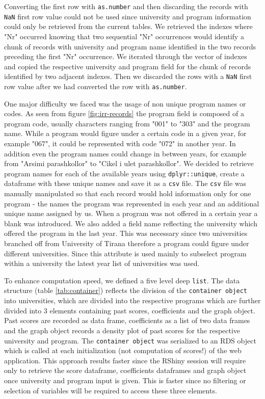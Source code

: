 \documentclass{article}
\begin{document}
Converting the first row with \texttt{as.number} and then discarding the records with \texttt{NaN} first row value could not be used since university and program information could only be retrieved from the current tables. We retrieved the indexes where "Nr" occurred knowing that two sequential "Nr" occurrences would identify a chunk of records with university and program name identified in the two records preceding the first "Nr" occurrence. We iterated through the vector of indexes and copied the respective university and program field for the chunk of records identified by two adjacent indexes. Then we discarded the rows with a \texttt{NaN} first row value after we had converted the row with \texttt{as.number}.

One major difficulty we faced was the usage of non unique program names or codes. As seen from figure \ref{fig:irr-records} the program field is composed of a program code, usually characters ranging from "001" to "303" and the program name. While a program would figure under a certain code in a given year, for example "067", it could be represented with code "072" in another year. In addition even the program names could change in between years, for example from "Arsimi parashkollor" to "Cikel i ulet parashkollor". We decided to retrieve program names for each of the available years using \texttt{dplyr::unique}, create a dataframe with these unique names and save it as a \texttt{csv} file. The \texttt{csv} file was manually manipulated so that each record would hold information only for one program - the names the program was represented in each year and an additional unique name assigned by us. When a program was not offered in a certain year a blank was introduced. We also added a field name reflecting the university which offered the program in the last year. This was necessary since two universities branched off from University of Tirana therefore a program could figure under different universities. Since this attribute is used mainly to subselect program within a university the latest year list of universities was used.

To enhance computation speed, we defined a five level deep \texttt{list}. The data structure (table \ref{tab:container}) reflects the division of the \texttt{container object} into universities, which are divided into the respective programs which are further divided into 3 elements containing past scores, coefficients and the graph object. Past scores are recorded as data frame, coefficients as a list of two data frames and the graph object records a density plot of past scores for the respective university and program. The \texttt{container object} was serialized to an RDS object which is called at each initialization (not computation of scores!) of the web application. This approach results faster since the RShiny session will require only to retrieve the score dataframe, coefficients dataframes and graph object once university and program input is given. This is faster since no filtering or selection of variables will be required to access these three elements.
\end{document}
